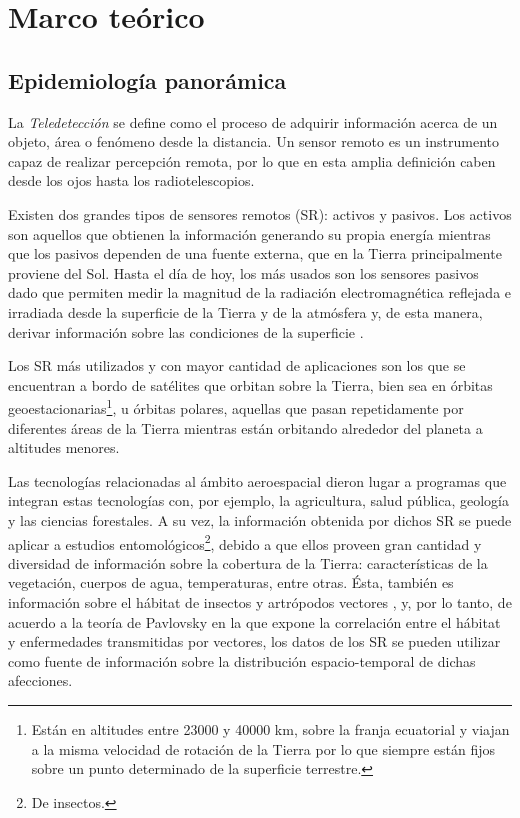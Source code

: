 %
%
%

\chapter{Marco teórico}

\section{Epidemiología panorámica}

\justifying


\par La \textit{Teledetección} se define como el proceso de adquirir
  información acerca de un objeto, área o fenómeno desde la distancia.
  Un sensor remoto es un instrumento capaz de realizar percepción remota, por lo
  que en esta amplia definición caben desde los ojos hasta los
  radiotelescopios.

\par Existen dos grandes tipos de sensores remotos (SR): activos y pasivos.
  Los activos son aquellos que obtienen la información generando su propia energía
  mientras que los pasivos dependen de una fuente externa, que en la Tierra
  principalmente proviene del Sol. Hasta el día de hoy, los más usados son los
  sensores pasivos dado que permiten medir la magnitud de la radiación electromagnética
  reflejada e irradiada desde la superficie de la Tierra y de la atmósfera y,
  de esta manera, derivar información sobre las condiciones de la superficie \cite{cami_tartagal}.


\par Los SR más utilizados y con mayor cantidad de aplicaciones son los que se
  encuentran a bordo de satélites que orbitan sobre la Tierra, bien sea
  en órbitas geoestacionarias\footnote{Están en altitudes entre 23000 y 40000 km,
  sobre la franja ecuatorial y viajan a la misma velocidad de rotación de la Tierra
  por lo que siempre están fijos sobre un punto determinado de la superficie terrestre.},
  u órbitas polares, aquellas que pasan repetidamente por diferentes áreas
  de la Tierra mientras están orbitando alrededor del planeta a altitudes menores.


\par Las tecnologías relacionadas al ámbito aeroespacial dieron lugar a programas
  que integran estas tecnologías con,
  por ejemplo, la agricultura, salud pública, geología y las ciencias forestales.
  A su vez, la información obtenida por dichos SR se puede aplicar a estudios
  entomológicos\footnote{De insectos.}, debido a que ellos proveen gran cantidad
  y diversidad de información sobre la cobertura de la Tierra: características
  de la vegetación, cuerpos de agua, temperaturas, entre otras. Ésta, también es
  información sobre el hábitat de insectos y artrópodos vectores \cite{ndwi_erffectiveness, data_driven_prediction},
  y, por lo tanto, de acuerdo a la teoría de Pavlovsky \cite{nidality} en la que
  expone la correlación entre el hábitat y enfermedades transmitidas por vectores,
  los datos de los SR se pueden utilizar como fuente de información sobre la
  distribución espacio-temporal de dichas afecciones.


